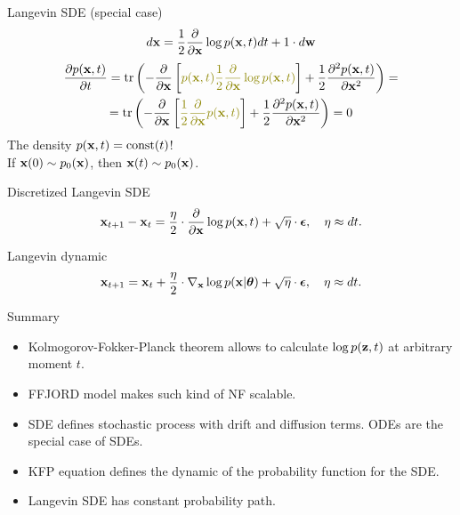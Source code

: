 \begin{frame}{Langevin SDE (special case)}
	\[
		d \mathbf{x} = \frac{1}{2} \frac{\partial}{\partial \mathbf{x}} \log p(\mathbf{x}, t) d t + 1 \cdot d \mathbf{w}
	\]
	\begin{multline*}
		\frac{\partial p(\bx, t)}{\partial t} =  \text{tr} \left(- \frac{\partial}{\partial \bx}\left[ {\color{olive}p(\bx, t) \frac{1}{2} \frac{\partial}{\partial \bx} \log p(\bx, t)} \right]  + \frac{1}{2} \frac{\partial^2 p(\bx, t)}{\partial \bx^2} \right) = \\
		= \text{tr} \left(- \frac{\partial}{\partial \bx}\left[ {\color{olive}\frac{1}{2} \frac{\partial}{\partial \bx} p(\bx, t) } \right]  + \frac{1}{2} \frac{\partial^2 p(\bx, t)}{\partial \bx^2} \right) = 0
	\end{multline*}
	The density $p(\mathbf{x}, t) = \text{const}(t)$! \\ If $\mathbf{x}(0) \sim p_0(\mathbf{x})$, then $\mathbf{x}(t) \sim p_0(\mathbf{x})$.
	\begin{block}{Discretized Langevin SDE}
		\vspace{-0.3cm}
		\[
			\mathbf{x}_{t + 1} - \mathbf{x}_t = \frac{\eta}{2} \cdot \frac{\partial}{\partial \mathbf{x}} \log p(\mathbf{x}, t) + \sqrt{\eta} \cdot \boldsymbol{\epsilon}, \quad \eta \approx dt.
		\]
		\vspace{-0.4cm}
	\end{block}
	\begin{block}{Langevin dynamic}
		\vspace{-0.3cm}
		\[
			\mathbf{x}_{t + 1} = \mathbf{x}_t + \frac{\eta}{2} \cdot \nabla_{\mathbf{x}} \log p(\mathbf{x} | \boldsymbol{\theta}) + \sqrt{\eta} \cdot \boldsymbol{\epsilon}, \quad \eta \approx dt.
		\]
		\vspace{-0.3cm}
	\end{block}
\end{frame}
\begin{frame}{Summary}
	\begin{itemize}
		\item Kolmogorov-Fokker-Planck theorem allows to calculate $\log p(\mathbf{z}, t)$ at arbitrary moment $t$.
		\vfill
		\item FFJORD model makes such kind of NF scalable.
		\vfill
		\item SDE defines stochastic process with drift and diffusion terms. ODEs are the special case of SDEs.
		\vfill
		\item KFP equation defines the dynamic of the probability function for the SDE. 
		\vfill
		\item Langevin SDE has constant probability path.
	\end{itemize}
\end{frame}
 